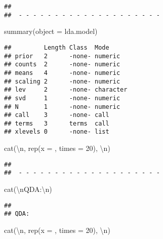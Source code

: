 \documentclass[
]{article}
\newenvironment{Shaded}{\begin{snugshade}}{\end{snugshade}}
\newcommand{\AttributeTok}[1]{\textcolor[rgb]{0.77,0.63,0.00}{#1}}
\newcommand{\DecValTok}[1]{\textcolor[rgb]{0.00,0.00,0.81}{#1}}
\newcommand{\FunctionTok}[1]{\textcolor[rgb]{0.00,0.00,0.00}{#1}}
\newcommand{\NormalTok}[1]{#1}
\newcommand{\SpecialCharTok}[1]{\textcolor[rgb]{0.00,0.00,0.00}{#1}}
\newcommand{\StringTok}[1]{\textcolor[rgb]{0.31,0.60,0.02}{#1}}
\begin{document}
\begin{verbatim}
## 
##  - - - - - - - - - - - - - - - - - - - -
\end{verbatim}

\begin{Shaded}
\begin{Highlighting}[]
\FunctionTok{summary}\NormalTok{(}\AttributeTok{object =}\NormalTok{ lda.model)}
\end{Highlighting}
\end{Shaded}

\begin{verbatim}
##         Length Class  Mode     
## prior   2      -none- numeric  
## counts  2      -none- numeric  
## means   4      -none- numeric  
## scaling 2      -none- numeric  
## lev     2      -none- character
## svd     1      -none- numeric  
## N       1      -none- numeric  
## call    3      -none- call     
## terms   3      terms  call     
## xlevels 0      -none- list
\end{verbatim}

\begin{Shaded}
\begin{Highlighting}[]
\FunctionTok{cat}\NormalTok{(}\StringTok{\textquotesingle{}}\SpecialCharTok{\textbackslash{}n}\StringTok{\textquotesingle{}}\NormalTok{, }\FunctionTok{rep}\NormalTok{(}\AttributeTok{x =} \StringTok{\textquotesingle{}{-}\textquotesingle{}}\NormalTok{, }\AttributeTok{times =} \DecValTok{20}\NormalTok{), }\StringTok{\textquotesingle{}}\SpecialCharTok{\textbackslash{}n}\StringTok{\textquotesingle{}}\NormalTok{)}
\end{Highlighting}
\end{Shaded}

\begin{verbatim}
## 
##  - - - - - - - - - - - - - - - - - - - -
\end{verbatim}

\begin{Shaded}
\begin{Highlighting}[]
\FunctionTok{cat}\NormalTok{(}\StringTok{\textquotesingle{}}\SpecialCharTok{\textbackslash{}n}\StringTok{QDA:}\SpecialCharTok{\textbackslash{}n}\StringTok{\textquotesingle{}}\NormalTok{)}
\end{Highlighting}
\end{Shaded}

\begin{verbatim}
## 
## QDA:
\end{verbatim}

\begin{Shaded}
\begin{Highlighting}[]
\FunctionTok{cat}\NormalTok{(}\StringTok{\textquotesingle{}}\SpecialCharTok{\textbackslash{}n}\StringTok{\textquotesingle{}}\NormalTok{, }\FunctionTok{rep}\NormalTok{(}\AttributeTok{x =} \StringTok{\textquotesingle{}{-}\textquotesingle{}}\NormalTok{, }\AttributeTok{times =} \DecValTok{20}\NormalTok{), }\StringTok{\textquotesingle{}}\SpecialCharTok{\textbackslash{}n}\StringTok{\textquotesingle{}}\NormalTok{)}
\end{Highlighting}
\end{Shaded}
\end{document}
